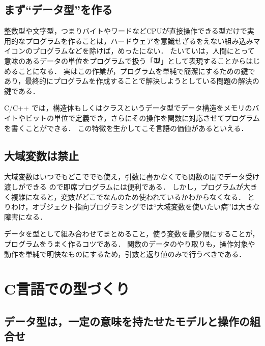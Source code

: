 \documentclass[11pt,a4,epsf]{jarticle}
\begin{document}
\subsection{まず``データ型''を作る}

整数型や文字型，つまりバイトやワードなどCPUが直接操作できる型だけで実用的なプログラムを作ることは，ハードウェアを意識せざるをえない組み込みマイコンのプログラムなどを除けば，めったにない．
たいていは，人間にとって意味のあるデータの単位をプログラムで扱う「型」として表現することからはじめることになる．
実はこの作業が，プログラムを単純で簡潔にするための鍵であり，最終的にプログラムを作成することで解決しようとしている問題の解決の鍵である．

C/C++ では，構造体もしくはクラスというデータ型でデータ構造をメモリのバイトやビットの単位で定義でき，さらにその操作を関数に対応させてプログラムを書くことができる．
この特徴を生かしてこそ言語の価値があるといえる．



\subsection{大域変数は禁止}

大域変数はいつでもどこででも使え，引数に書かなくても関数の間でデータ受け渡しができる
ので即席プログラムには便利である．
しかし，プログラムが大きく複雑になると，変数がどこでなんのため使われているかわからなくなる．
とりわけ，オブジェクト指向プログラミングでは``大域変数を使いたい病''は大きな障害になる．

データを型として組み合わせてまとめること，使う変数を最少限にすることが，
プログラムをうまく作るコツである．
関数のデータのやり取りも，操作対象や動作を単純で明快なものにするため，引数と返り値のみで行うべきである．



\section{C言語での型づくり}

\subsection{データ型は，一定の意味を持たせたモデルと操作の組合せ} %
\end{document}
